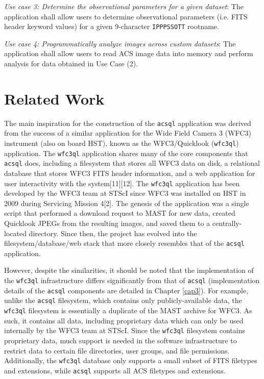 \documentclass[10pt,journal,compsoc]{IEEEtran}
\begin{document}
\textit{Use case 3: Determine the observational parameters for a given dataset}: The application shall allow users to determine observational parameters (i.e. FITS header keyword values) for
a given 9-character \texttt{IPPPSSOTT} rootname.

\textit{Use case 4: Programmatically analyze images across custom datasets}: The application shall allow users to read ACS image data into memory and perform analysis for data obtained
in Use Case (2).


\section{Related Work} \label{chap2}

The main inspiration for the construction of the \texttt{acsql} application was derived from the success of a similar application for the Wide Field Camera 3 (WFC3) instrument
(also on board HST), known as the WFC3/Quicklook (\texttt{wfc3ql}) application.  The \texttt{wfc3ql} application shares many of the core components that \texttt{acsql} does,
including a filesystem that stores all WFC3 data on disk, a relational database that stores WFC3 FITS header information, and a web application for user interactivity with the
system[11][12].  The \texttt{wfc3ql} application has been developed by the WFC3 team at STScI since WFC3 was installed on HST in 2009 during Servicing Mission 4[2].  The genesis of
the application was a single script that performed a download request to MAST for new data, created Quicklook JPEGs from the resulting images, and saved them to a centrally-located
directory.  Since then, the project has evolved into the filesystem/database/web stack that more closely resembles that of the \texttt{acsql} application.

However, despite the similarities, it should be noted that the implementation of the \texttt{wfc3ql} infrastructure differs significantly from that of \texttt{acsql}
(implementation details of the \texttt{acsql} components are detailed in Chapter \ref{cap3}).  For example, unlike the \texttt{acsql} filesystem, which contains only
publicly-available data, the \texttt{wfc3ql} filesystem is essentially a duplicate of the MAST archive for WFC3.  As such, it contains all data, including proprietary data which can
only be used internally by the WFC3 team at STScI.  Since the \texttt{wfc3ql} filesystem contains proprietary data, much support is needed in the software infrastructure to restrict
data to certain file directories, user groups, and file permissions.  Additionally, the \texttt{wfc3ql} database only supports a small subset of FITS filetypes and extensions, while
\texttt{acsql} supports all ACS filetypes and extensions.
\end{document}
